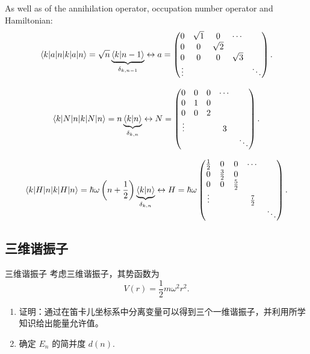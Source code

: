 As well as of the annihilation operator, occupation number operator and Hamiltonian:
\begin{equation}
	\braket{k|a|n}=\sqrt{n} \underbrace{\braket{k}{n-1}}_{\delta_{k,n-1}} \leftrightarrow a=\begin{pmatrix}0 & \sqrt{1} & 0 & \cdots & \\ 0 & 0 & \sqrt{2} & & \\ 0 & 0 & 0 & \sqrt{3} & \\ \vdots & & & & \ddots \end{pmatrix}.
\end{equation}

\begin{equation}
	\braket{k|N|n}=n \underbrace{\braket{k}{n}}_{\delta_{k,n}} \leftrightarrow N=\begin{pmatrix}0 & 0 & 0 & \cdots & \\ 0 & 1 & 0 & & \\ 0 & 0 & 2 & & \\ \vdots & & & 3 & \\ & & & & \ddots\end{pmatrix}.
\end{equation}

\begin{equation}
	\braket{k|H|n}=\hbar\omega\left(n+\frac{1}{2}\right) \underbrace{\braket{k}{n}}_{\delta_{k,n}} \leftrightarrow H=\hbar\omega\begin{pmatrix} \frac{1}{2} & 0 & 0 & \cdots & \\ 0 & \frac{3}{2} & 0 & & \\ 0 & 0 & \frac{5}{2} & & \\ \vdots & & & \frac{7}{2} & \\ & & & & \ddots \end{pmatrix} .
\end{equation}
\subsection{三维谐振子}
\begin{problembox}{三维谐振子}
	考虑三维谐振子，其势函数为
	\[
	V(r) = \frac{1}{2} m \omega^{2} r^{2}.
	\]
	
	\begin{enumerate}
		\item[(a)] 证明：通过在笛卡儿坐标系中分离变量可以得到三个一维谐振子，并利用所学知识给出能量允许值。
		
		\item[(b)] 确定 \(E_{n}\) 的简并度 \(d(n)\).
	\end{enumerate}
\end{problembox}


